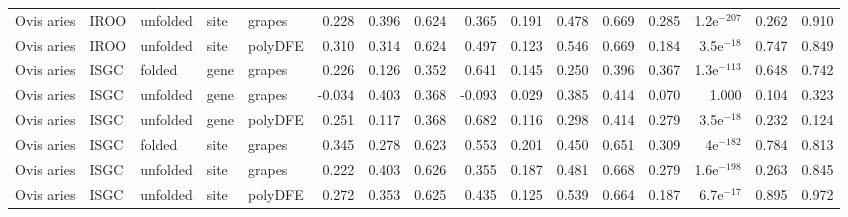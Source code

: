 \begin{longtable}{lllllrrrrrrrrrrr}
          Ovis aries &                      IROO &  unfolded &  site &   grapes &                              0.228 &                               0.396 &                 0.624 &                 0.365 &                              0.191 &                               0.478 &                 0.669 &                 0.285 & 1.2e$^{-207}$ &  0.262 &  0.910 \\
          Ovis aries &                      IROO &  unfolded &  site &  polyDFE &                              0.310 &                               0.314 &                 0.624 &                 0.497 &                              0.123 &                               0.546 &                 0.669 &                 0.184 &  3.5e$^{-18}$ &  0.747 &  0.849 \\
          Ovis aries &                      ISGC &    folded &  gene &   grapes &                              0.226 &                               0.126 &                 0.352 &                 0.641 &                              0.145 &                               0.250 &                 0.396 &                 0.367 & 1.3e$^{-113}$ &  0.648 &  0.742 \\
          Ovis aries &                      ISGC &  unfolded &  gene &   grapes &                             -0.034 &                               0.403 &                 0.368 &                -0.093 &                              0.029 &                               0.385 &                 0.414 &                 0.070 &         1.000 &  0.104 &  0.323 \\
          Ovis aries &                      ISGC &  unfolded &  gene &  polyDFE &                              0.251 &                               0.117 &                 0.368 &                 0.682 &                              0.116 &                               0.298 &                 0.414 &                 0.279 &  3.5e$^{-18}$ &  0.232 &  0.124 \\
          Ovis aries &                      ISGC &    folded &  site &   grapes &                              0.345 &                               0.278 &                 0.623 &                 0.553 &                              0.201 &                               0.450 &                 0.651 &                 0.309 &   4e$^{-182}$ &  0.784 &  0.813 \\
          Ovis aries &                      ISGC &  unfolded &  site &   grapes &                              0.222 &                               0.403 &                 0.626 &                 0.355 &                              0.187 &                               0.481 &                 0.668 &                 0.279 & 1.6e$^{-198}$ &  0.263 &  0.845 \\
          Ovis aries &                      ISGC &  unfolded &  site &  polyDFE &                              0.272 &                               0.353 &                 0.625 &                 0.435 &                              0.125 &                               0.539 &                 0.664 &                 0.187 &  6.7e$^{-17}$ &  0.895 &  0.972 \\
\end{longtable}
